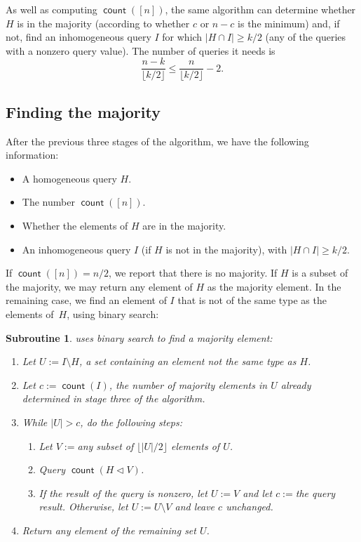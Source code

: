 \documentclass[11pt]{llncs}
\newcommand{\qcount}{\operatorname{\mathsf{count}}}
\newcommand{\inject}{\triangleleft}
\newcommand{\assign}{:=}
\newtheorem{subroutine}{Subroutine}
\begin{document}
As well as computing $\qcount([n])$, the same algorithm can determine whether $H$ is in the majority (according to whether $c$ or $n-c$ is the minimum) and, if not, find an inhomogeneous query $I$ for which $|H\cap I|\ge k/2$ (any of the queries with a nonzero query value). The number of queries it needs is
\[
\frac{n-k}{\lfloor k/2\rfloor} \le
\frac{n}{\lfloor k/2\rfloor} -2.
\]

\subsection{Finding the majority}

After the previous three stages of the algorithm, we have the following information:
\begin{itemize}
\item A homogeneous query $H$.
\item The number $\qcount([n])$.
\item Whether the elements of $H$ are in the majority.
\item An inhomogeneous query $I$ (if $H$ is not in the majority), with $|H\cap I|\ge k/2$.
\end{itemize}

If $\qcount([n])=n/2$, we report that there is no majority. If $H$ is a subset of the majority, we may return any element of $H$ as the majority element. In the remaining case, we find an element of $I$ that is not of the same type as the elements of~$H$, using binary search:

\begin{subroutine} uses binary search to find a majority element:
\label{sbr:find-majority}
\begin{enumerate}
\item Let $U\assign I\setminus H$, a set containing an element not the same type as $H$.
\item Let $c\assign\qcount(I)$, the number of majority elements in $U$ already determined in stage three of the algorithm.
\item While $|U|>c$, do the following steps:
\begin{enumerate}
\item Let $V\assign{}$any subset of $\lfloor|U|/2\rfloor$ elements of $U$.
\item Query $\qcount(H\inject V)$.
\item If the result of the query is nonzero, let $U\assign V$ and let $c\assign{}$the query result. Otherwise, let $U\assign U\setminus V$ and leave $c$ unchanged.
\end{enumerate}
\item Return any element of the remaining set $U$. 
\end{enumerate}
\end{subroutine}
\end{document}

